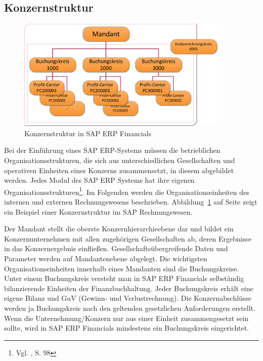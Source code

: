 \subsection{Konzernstruktur}
\begin{figure}[htbp]
\begin{center}
\includegraphics[width=0.9\textwidth]{Images/konzernStruktur.png}

   \caption[Konzernstruktur in SAP ERP Financials]{Konzernstruktur in SAP ERP Financials}\label{abb2}
\end{center}
\end{figure}\noindent
Bei der Einführung eines SAP ERP-Systems müssen die betrieblichen Organisationsstrukturen, die sich aus unterschiedlichen Gesellschaften und operativen Einheiten eines Konzerns zusammensetzt, in diesem abgebildet werden.
Jedes Modul des SAP ERP Systems hat ihre eigenen Organisationsstrukturen\footnote{Vgl. \cite{Klein2010}, S. 98}. Im Folgenden werden die Organisationseinheiten des internen und externen Rechnungswesens beschrieben. Abbildung~\ref{abb2} auf Seite \pageref{abb2} zeigt ein Beispiel einer Konzernstruktur im SAP Rechnungswesen.

Der Mandant stellt die oberste Konzernhierarchieebene dar und bildet ein Konzernunternehmen mit allen zugehörigen Gesellschaften ab, deren Ergebnisse in das Konzernergebnis einfließen. Gesellschaftsübergreifende Daten und Parameter werden auf Mandantenebene abgelegt.
Die wichtigsten Organisationseinheiten innerhalb eines Mandanten sind die Buchungskreise. Unter einem Buchungskreis versteht man in SAP ERP Financials selbständig bilanzierende Einheiten der Finanzbuchhaltung. Jeder Buchungskreis erhält eine eigene Bilanz und GuV (Gewinn- und Verlustrechnung). Die Konzernabschlüsse werden ja Buchungskreis nach den geltenden gesetzlichen Anforderungen erstellt. Wenn die Unternehmung/Konzern nur aus einer Einheit zusammengesetzt sein sollte, wird in SAP ERP Financials mindestens ein Buchungskreis eingerichtet.

